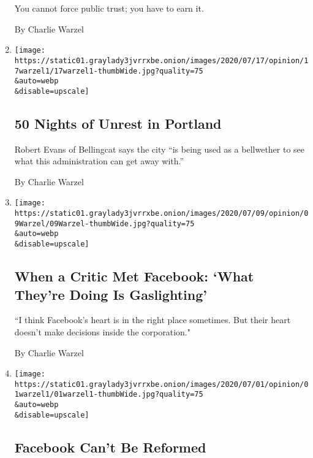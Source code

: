 \begin{enumerate}
  You cannot force public trust; you have to earn it.

  By Charlie Warzel
\item
  \href{/2020/07/17/opinion/portland-protests-federal-agents.html}{}

  \texttt{[image: https://static01.graylady3jvrrxbe.onion/images/2020/07/17/opinion/17warzel1/17warzel1-thumbWide.jpg?quality=75\\\&auto=webp\\\&disable=upscale]}

  \hypertarget{50-nights-of-unrest-in-portland}{%
  \subsection{50 Nights of Unrest in
  Portland}\label{50-nights-of-unrest-in-portland}}

  Robert Evans of Bellingcat says the city ``is being used as a
  bellwether to see what this administration can get away with.''

  By Charlie Warzel
\item
  \href{/2020/07/09/opinion/facebook-civil-rights-robinson.html}{}

  \texttt{[image: https://static01.graylady3jvrrxbe.onion/images/2020/07/09/opinion/09Warzel/09Warzel-thumbWide.jpg?quality=75\\\&auto=webp\\\&disable=upscale]}

  \hypertarget{when-a-critic-met-facebook-what-theyre-doing-is-gaslighting}{%
  \subsection{When a Critic Met Facebook: `What They're Doing Is
  Gaslighting'}\label{when-a-critic-met-facebook-what-theyre-doing-is-gaslighting}}

  ``I think Facebook's heart is in the right place sometimes. But their
  heart doesn't make decisions inside the corporation."

  By Charlie Warzel
\item
  \href{/2020/07/01/opinion/facebook-zuckerberg.html}{}

  \texttt{[image: https://static01.graylady3jvrrxbe.onion/images/2020/07/01/opinion/01warzel1/01warzel1-thumbWide.jpg?quality=75\\\&auto=webp\\\&disable=upscale]}

  \hypertarget{facebook-cant-be-reformed}{%
  \subsection{Facebook Can't Be
  Reformed}\label{facebook-cant-be-reformed}}


\end{enumerate}
